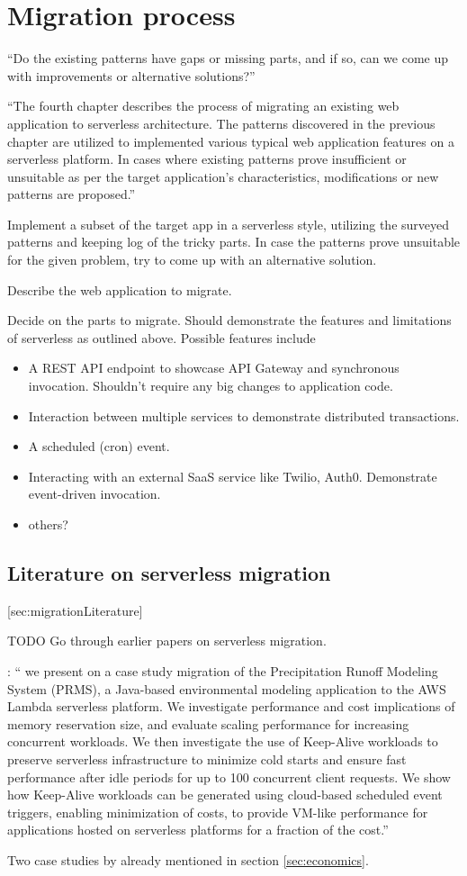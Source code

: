 \chapter{Migration process}

``Do the existing patterns have gaps or missing parts, and if so, can we come up with improvements or alternative solutions?''

``The fourth chapter describes the process of migrating an existing web application to serverless architecture. The patterns discovered in the previous chapter are utilized to implemented various typical web application features on a serverless platform. In cases where existing patterns prove insufficient or unsuitable as per the target application's characteristics, modifications or new patterns are proposed.''

Implement a subset of the target app in a serverless style, utilizing the surveyed patterns and keeping log of the tricky parts. In case the patterns prove unsuitable for the given problem, try to come up with an alternative solution.

Describe the web application to migrate.

Decide on the parts to migrate. Should demonstrate the features and limitations of serverless as outlined above. Possible features include
\begin{itemize}
  \item A REST API endpoint to showcase API Gateway and synchronous invocation. Shouldn't require any big changes to application code.
  \item Interaction between multiple services to demonstrate distributed transactions.
  \item A scheduled (cron) event.
  \item Interacting with an external SaaS service like Twilio, Auth0. Demonstrate event-driven invocation.
  \item others?
\end{itemize}

\section{Literature on serverless migration}[sec:migrationLiterature]

TODO Go through earlier papers on serverless migration.

\textcite{lloyd18migration}: `` we present on a case study migration of the Precipitation Runoff Modeling System (PRMS), a Java-based environmental modeling application to the AWS Lambda serverless platform. We investigate performance and cost implications of memory reservation size, and evaluate scaling performance for increasing concurrent workloads. We then investigate the use of Keep-Alive workloads to preserve serverless infrastructure to minimize cold starts and ensure fast performance after idle periods for up to 100 concurrent client requests. We show how Keep-Alive workloads can be generated using cloud-based scheduled event triggers, enabling minimization of costs, to provide VM-like performance for applications hosted on serverless platforms for a fraction of the cost.''

Two case studies by \textcite{adzic2017serverless} already mentioned in section \ref{sec:economics}.
